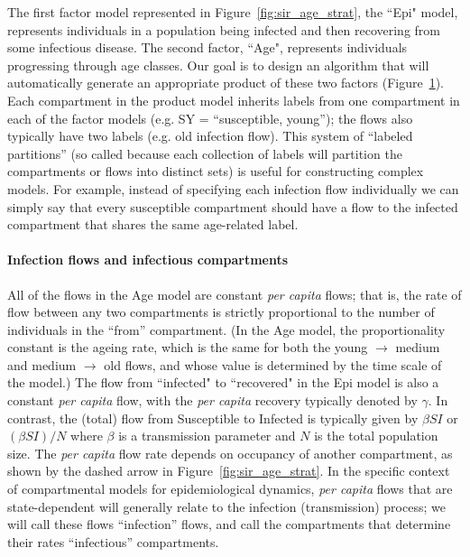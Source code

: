 \begin{figure}
    \centering
    
    \caption{}
    \label{fig:simple_sir_age}
\end{figure}

The first factor model represented in Figure~\ref{fig:sir_age_strat}, the ``Epi" model, represents individuals in a population being infected and then recovering from some infectious disease. The second factor, ``Age", represents individuals progressing through age classes. Our goal is to design an algorithm that will automatically generate an appropriate product of these two factors (Figure~\ref{fig:simple_sir_age}). Each compartment in the product model inherits labels from one compartment in each of the factor models (e.g. SY = ``susceptible, young''); the flows also typically have two labels (e.g. old infection flow).  This system of ``labeled partitions'' (so called because each collection of labels will partition the compartments or flows into distinct sets) is useful for constructing complex models. For example, instead of specifying each infection flow individually we can simply say that every susceptible compartment should have a flow to the infected compartment that shares the same age-related label.

\paragraph{Infection flows and infectious compartments}

All of the flows in the Age model are constant \emph{per capita} flows; that is, the rate of flow between any two compartments is strictly proportional to the number of individuals in the ``from'' compartment. (In the Age model, the proportionality constant is the ageing rate, which is the same for both the young $\to$ medium and medium $\to$ old flows, and whose value is determined by the time scale of the model.)
The flow from ``infected" to ``recovered" in the Epi model is also a constant \emph{per capita} flow, with the \emph{per capita} recovery typically denoted by $\gamma$. In contrast, the (total) flow from Susceptible to Infected is typically given by $\beta SI$ or $(\beta S I)/N$ where $\beta$ is a transmission parameter and $N$ is the total population size. The \emph{per capita} flow rate depends on occupancy of another compartment, as shown by the dashed arrow in Figure~\ref{fig:sir_age_strat}. In the specific context of compartmental models for epidemiological dynamics, \emph{per capita} flows that are state-dependent will generally relate to the infection (transmission) process; we will call these flows ``infection'' flows, and call the compartments that determine their rates ``infectious'' compartments.

